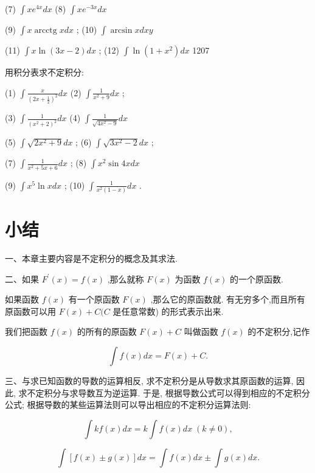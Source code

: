 \documentclass[lang=cn,newtx,10pt,scheme=chinese]{elegantbook}
\begin{document}
\begin{problemset}[习 题 十 四]
(7) \(\int x{e}^{4x}{dx}\) (8) \(\int x{e}^{-{3x}}{dx}\)

(9) \(\int x\operatorname{arcctg}{xdx}\) ; (10) \(\int \arcsin {xdxy}\)

(11) \(\int x\ln \left( {{3x} - 2}\right) {dx}\) ; (12) \(\int \ln \left( {1 + {x}^{2}}\right) {dx}\) 1207

\item * 用积分表求不定积分:

(1) \(\int \frac{x}{{\left( 2x + \frac{1}{2}\right) }^{2}}{dx}\) (2) \(\int \frac{1}{{x}^{2} + 9}{dx}\) ;

(3) \(\int \frac{1}{{\left( {x}^{2} + 2\right) }^{2}}{dx}\) (4) \(\int \frac{1}{\sqrt{4{x}^{2} - 9}}{dx}\)

(5) \(\int \sqrt{2{x}^{2} + 9}{dx}\) ; (6) \(\int \sqrt{3{x}^{2} - 2}{dx}\) ;

(7) \(\int \frac{1}{{x}^{2} + {5x} + 6}{dx}\) ; (8) \(\int {x}^{2}\sin {4xdx}\)

(9) \(\int {x}^{5}\ln {xdx}\) ; (10) \(\int \frac{1}{{x}^{2}\left( {1 - x}\right) }{dx}\) .

\end{problemset}

\chapter*{小结}

一、本章主要内容是不定积分的概念及其求法.

二、如果 \({F}^{\prime }\left( x\right) = f\left( x\right)\) ,那么就称 \(F\left( x\right)\) 为函数 \(f\left( x\right)\) 的一个原函数.

如果函数 \(f\left( x\right)\) 有一个原函数 \(F\left( x\right)\) ,那么它的原函数就. 有无穷多个,而且所有原函数可以用 \(F\left( x\right) + C(C\) 是任意常数) 的形式表示出来.

我们把函数 \(f\left( x\right)\) 的所有的原函数 \(F\left( x\right) + C\) 叫做函数 \(f\left( x\right)\) 的不定积分,记作

\[
\int f\left( x\right) {dx} = F\left( x\right) + C.
\]

三、与求已知函数的导数的运算相反, 求不定积分是从导数求其原函数的运算, 因此, 求不定积分与求导数互为逆运算. 于是, 根据导数公式可以得到相应的不定积分公式; 根据导数的某些运算法则可以导出相应的不定积分运算法则:

\[
\int {kf}\left( x\right) {dx} = k\int f\left( x\right) {dx}\;\left( {k \neq 0}\right) ,
\]

\[
\int \left\lbrack {f\left( x\right) \pm g\left( x\right) }\right\rbrack {dx} = \int f\left( x\right) {dx} \pm \int g\left( x\right) {dx}.
\]
\end{document}
